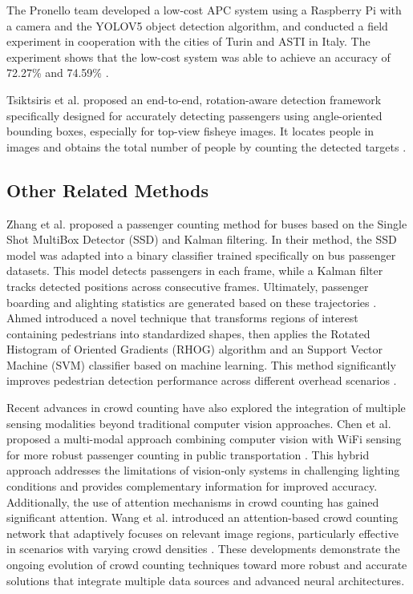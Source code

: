 The Pronello team developed a low-cost APC system using a Raspberry Pi with a camera and the YOLOV5 object detection algorithm, and conducted a field experiment in cooperation with the cities of Turin and ASTI in Italy. The experiment shows that the low-cost system was able to achieve an accuracy of 72.27\% and 74.59\% \cite{49_pronello_evaluating_2023}.

Tsiktsiris et al. proposed an end-to-end, rotation-aware detection framework specifically designed for accurately detecting passengers using angle-oriented bounding boxes, especially for top-view fisheye images. It locates people in images and obtains the total number of people by counting the detected targets \cite{55_tsiktsiris_improving_2024}.


\subsection{Other Related Methods}
Zhang et al. proposed a passenger counting method for buses based on the Single Shot MultiBox Detector (SSD) and Kalman filtering. In their method, the SSD model was adapted into a binary classifier trained specifically on bus passenger datasets. This model detects passengers in each frame, while a Kalman filter tracks detected positions across consecutive frames. Ultimately, passenger boarding and alighting statistics are generated based on these trajectories \cite{66_zhang_bus_2020}. Ahmed introduced a novel technique that transforms regions of interest containing pedestrians into standardized shapes, then applies the Rotated Histogram of Oriented Gradients (RHOG) algorithm and an Support Vector Machine (SVM) classifier based on machine learning. This method significantly improves pedestrian detection performance across different overhead scenarios \cite{05_ahmed_person_2019}.

Recent advances in crowd counting have also explored the integration of multiple sensing modalities beyond traditional computer vision approaches. Chen et al. proposed a multi-modal approach combining computer vision with WiFi sensing for more robust passenger counting in public transportation \cite{chen2018multimodal}. This hybrid approach addresses the limitations of vision-only systems in challenging lighting conditions and provides complementary information for improved accuracy. Additionally, the use of attention mechanisms in crowd counting has gained significant attention. Wang et al. introduced an attention-based crowd counting network that adaptively focuses on relevant image regions, particularly effective in scenarios with varying crowd densities \cite{wang2018attention}. These developments demonstrate the ongoing evolution of crowd counting techniques toward more robust and accurate solutions that integrate multiple data sources and advanced neural architectures.

